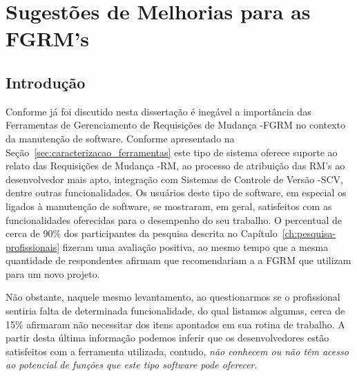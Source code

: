 \chapter{Sugestões de Melhorias para as FGRM's}
\label{ch:sug_melhoria}

\section{Introdução}
\label{sec:sug_melhoria_intro}

Conforme já foi discutido nesta dissertação é inegável a importância das
Ferramentas de Gerenciamento de Requisições de Mudança \@-\@ FGRM no contexto da
manutenção de software. Conforme apresentado na
Seção~\ref{sec:caracterizacao_ferramentas} este tipo de sistema oferece suporte
ao relato das Requisições de Mudança \@-\@ RM, ao processo de atribuição das
RM's ao desenvolvedor mais apto, integração com Sistemas de Controle de Versão
\@-\@ SCV, dentre outras funcionalidades. Os usuários deste tipo de software, em
especial os ligados à manutenção de software, se mostraram, em geral,
satisfeitos com as funcionalidades oferecidas para o desempenho do seu trabalho.
O percentual de cerca de 90\% dos par\-ti\-ci\-pan\-tes da pesquisa descrita no
Capítulo~\ref{ch:pesquisa-profissionais} fizeram uma avaliação positiva, ao
mesmo tempo que a mesma quantidade de respondentes afirmam que recomendariam a a
FGRM que utilizam para um novo projeto.

Não obstante, naquele mesmo levantamento, ao questionarmos se o profissional
sentiria falta de determinada funcionalidade, do qual listamos algumas, cerca de
15\% afirmaram não necessitar dos itens apontados em sua rotina de trabalho. A
partir desta última informação podemos inferir que os desenvolvedores estão
satisfeitos com a ferramenta utilizada, contudo, \textit{não conhecem ou não têm
	acesso ao potencial de funções que este tipo software pode oferecer}.

